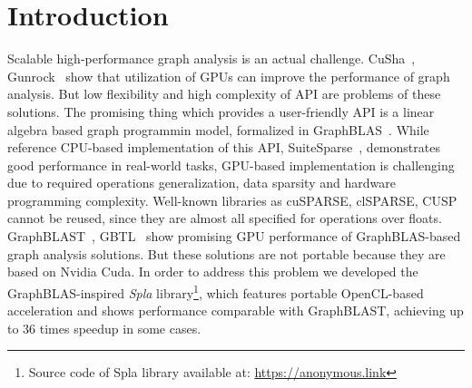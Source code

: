 \section{Introduction}


Scalable high-performance graph analysis is an actual challenge.
CuSha~\cite{10.1145/2600212.2600227}, Gunrock~\cite{7967137} show that utilization of GPUs can improve the performance of graph analysis. But low flexibility and high complexity of API are problems of these solutions. The promising thing which provides a user-friendly API is a linear algebra based graph programmin model, formalized in GraphBLAS~\cite{7761646}. While reference CPU-based implementation of this API, SuiteSparse~\cite{10.1145/3322125}, demonstrates good performance in real-world tasks, GPU-based implementation is challenging due to required operations generalization, data sparsity and hardware programming complexity. Well-known libraries as cuSPARSE, clSPARSE, CUSP cannot be reused, since they are almost all specified for operations over floats. GraphBLAST~\cite{yang2019graphblast}, GBTL~\cite{7529957} show promising GPU performance of GraphBLAS-based graph analysis solutions. But these solutions are not portable because they are based on Nvidia Cuda. In order to address this problem we developed the GraphBLAS-inspired \textit{Spla} library\footnote{Source code of Spla library available at: \url{https://anonymous.link}}, which features portable OpenCL-based acceleration and shows performance comparable with GraphBLAST, achieving up to 36 times speedup in some cases.
